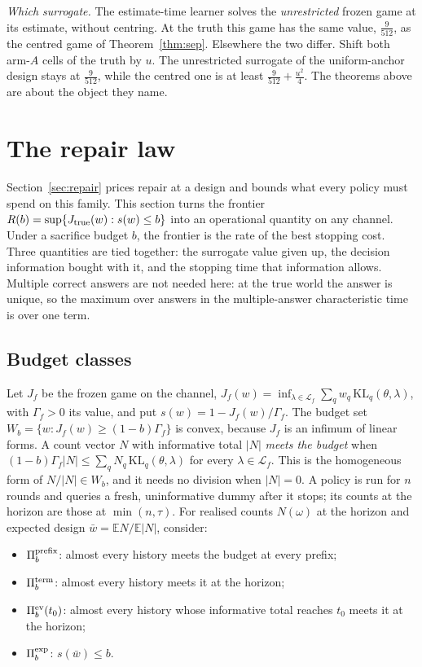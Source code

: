 \emph{Which surrogate.} The estimate-time learner solves the \emph{unrestricted} frozen game at
its estimate, without centring. At the truth this game has the same value, $\frac{9}{512}$, as
the centred game of Theorem~\ref{thm:sep}. Elsewhere the two differ. Shift both arm-$A$ cells
of the truth by $u$. The unrestricted surrogate of the uniform-anchor design stays at
$\frac{9}{512}$, while the centred one is at least $\frac{9}{512}+\frac{u^{2}}{4}$. The
theorems above are about the object they name.


\section{The repair law}
\label{sec:repairlaw}

Section~\ref{sec:repair} prices repair at a design and bounds what every policy must spend on
this family. This section turns the frontier $R(b)=\sup\{J_{\rm true}(w):s(w)\le b\}$ into an
operational quantity on any channel. Under a sacrifice budget $b$, the frontier is the rate
of the best stopping cost. Three quantities are tied together: the surrogate value given up,
the decision information bought with it, and the stopping time that information allows.
Multiple correct answers are not needed here: at the true world the answer is unique, so the
maximum over answers in the multiple-answer characteristic time~\cite{degenne2019} is over one
term.

\subsection{Budget classes}
Let $J_f$ be the frozen game on the channel,
$J_f(w)=\inf_{\lambda\in\mathcal L_f}\sum_qw_q\,\mathrm{KL}_q(\theta,\lambda)$, with
$\Gamma_f>0$ its value, and put $s(w)=1-J_f(w)/\Gamma_f$. The budget set
$W_b=\{w:J_f(w)\ge(1-b)\Gamma_f\}$ is convex, because $J_f$ is an infimum of linear forms.
A count vector $N$ with informative total $|N|$ \emph{meets the budget} when
$(1-b)\Gamma_f|N|\le\sum_qN_q\,\mathrm{KL}_q(\theta,\lambda)$ for every
$\lambda\in\mathcal L_f$. This is the homogeneous form of $N/|N|\in W_b$, and it needs no
division when $|N|=0$. A policy is run for $n$ rounds and queries a fresh, uninformative dummy
after it stops; its counts at the horizon are those at $\min(n,\tau)$. For realised counts
$N(\omega)$ at the horizon and expected design $\bar w=\mathbb EN/\mathbb E|N|$, consider:
\begin{itemize}
\item $\Pi_b^{\rm prefix}$: almost every history meets the budget at every prefix;
\item $\Pi_b^{\rm term}$: almost every history meets it at the horizon;
\item $\Pi_b^{\rm ev}(t_0)$: almost every history whose informative total reaches $t_0$ meets it
at the horizon;
\item $\Pi_b^{\rm exp}$: $s(\bar w)\le b$.
\end{itemize}

